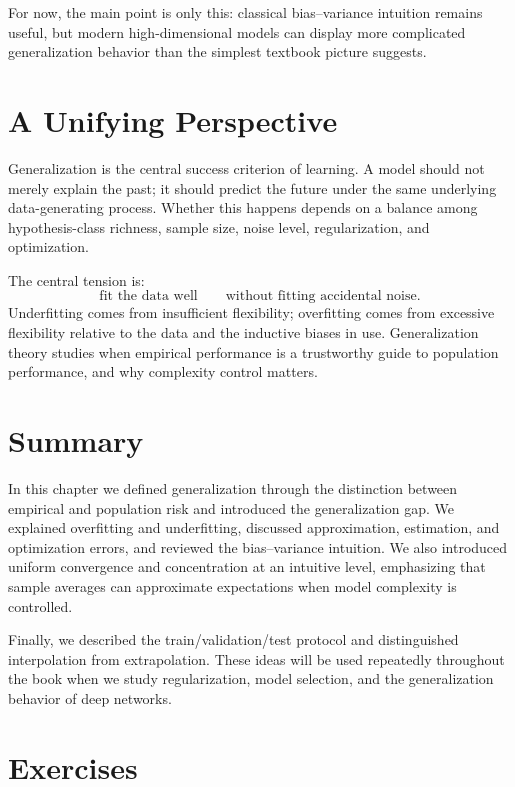 For now, the main point is only this: classical bias--variance intuition remains useful, but modern high-dimensional models can display more complicated generalization behavior than the simplest textbook picture suggests.

\section{A Unifying Perspective}

Generalization is the central success criterion of learning. A model should not merely explain the past; it should predict the future under the same underlying data-generating process. Whether this happens depends on a balance among hypothesis-class richness, sample size, noise level, regularization, and optimization.

The central tension is:
\[
\text{fit the data well} \qquad \text{without fitting accidental noise.}
\]
Underfitting comes from insufficient flexibility; overfitting comes from excessive flexibility relative to the data and the inductive biases in use. Generalization theory studies when empirical performance is a trustworthy guide to population performance, and why complexity control matters.

\section{Summary}

In this chapter we defined generalization through the distinction between empirical and population risk and introduced the generalization gap. We explained overfitting and underfitting, discussed approximation, estimation, and optimization errors, and reviewed the bias--variance intuition. We also introduced uniform convergence and concentration at an intuitive level, emphasizing that sample averages can approximate expectations when model complexity is controlled.

Finally, we described the train/validation/test protocol and distinguished interpolation from extrapolation. These ideas will be used repeatedly throughout the book when we study regularization, model selection, and the generalization behavior of deep networks.

\section{Exercises}

